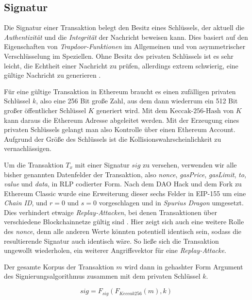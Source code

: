 \documentclass[runningheads]{llncs}
\begin{document}
\subsection{Signatur}
Die Signatur einer Transaktion belegt den Besitz eines Schlüssels, der aktuell die \textit{Authentizität} und die \textit{Integrität} der Nachricht beweisen kann. Dies basiert auf den Eigenschaften von \textit{Trapdoor-Funktionen} im Allgemeinen und von asymmetrischer Verschlüsselung im Speziellen. Ohne Besitz des privaten Schlüssels ist es sehr leicht, die Echtheit einer Nachricht zu prüfen, allerdings extrem schwierig, eine gültige Nachricht zu generieren \cite{roeder_cryptography_nodate}.

Für eine gültige Transaktion in Ethereum braucht es einen zufälligen privaten Schlüssel $ k $, also eine 256 Bit große Zahl, aus dem dann wiederrum ein 512 Bit großer öffentlicher Schlüssel $ K $ generiert wird. Mit dem $ \text{Keccak-256-Hash} $ von $ K $ kann daraus die Ethereum Adresse abgeleitet werden. Mit der Erzeugung eines privaten Schlüssels gelangt man also Kontrolle über einen Ethereum Account. Aufgrund der Größe des Schlüssels ist die Kollisionswahrscheinlichkeit zu vernachlässigen.

Um die Transaktion $ T_x $ mit einer Signatur $ sig $ zu versehen, verwenden wir alle bisher genannten Datenfelder der Transaktion, also \textit{nonce}, \textit{gasPrice}, \textit{gasLimit}, \textit{to}, \textit{value} und \textit{data}, in RLP codierter Form. Nach dem DAO Hack und dem Fork zu Ethereum Classic wurde eine Erweiterung dieser sechs Felder in EIP-155 \cite{noauthor_ethereum/eips_nodate} um eine \textit{Chain ID}, und $ r = 0 $ und $ s = 0 $ vorgeschlagen und in \textit{Spurius Dragon} umgesetzt. Dies verhindert etwaige \textit{Replay-Attacken}, bei denen Transaktionen über verschiedene Blockchainnetze gültig sind \cite[S. 138]{iyer_cryptoeconomics_2018}. Hier zeigt sich auch eine weitere Rolle des \textit{nonce}, denn alle anderen Werte könnten potentiell identisch sein, sodass die resultierende Signatur auch identisch wäre. So ließe sich die Transaktion ungewollt wiederholen, ein weiterer Angriffsvektor für eine \textit{Replay-Attacke}.

Der gesamte Korpus der Transaktion $ m $ wird dann in gehashter Form Argument des Signierungsalgorithmus zusammen mit dem privaten Schlüssel $ k $.

$$
  sig = F_{sig}(F_{Keccak256}(m), k)
$$
\end{document}
